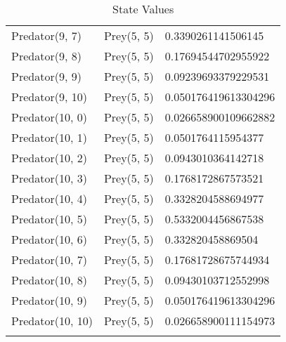 \begin{longtable}{| p{} | p{} | p{} |}
Predator(9, 7) & Prey(5, 5) &0.3390261141506145\\
Predator(9, 8) & Prey(5, 5) &0.17694544702955922\\
Predator(9, 9) & Prey(5, 5) &0.09239693379229531\\
Predator(9, 10) & Prey(5, 5) &0.050176419613304296\\
Predator(10, 0) & Prey(5, 5) &0.026658900109662882\\
Predator(10, 1) & Prey(5, 5) &0.0501764115954377\\
Predator(10, 2) & Prey(5, 5) &0.0943010364142718\\
Predator(10, 3) & Prey(5, 5) &0.1768172867573521\\
Predator(10, 4) & Prey(5, 5) &0.3328204588694977\\
Predator(10, 5) & Prey(5, 5) &0.5332004456867538\\
Predator(10, 6) & Prey(5, 5) &0.332820458869504\\
Predator(10, 7) & Prey(5, 5) &0.17681728675744934\\
Predator(10, 8) & Prey(5, 5) &0.09430103712552998\\
Predator(10, 9) & Prey(5, 5) &0.050176419613304296\\
Predator(10, 10) & Prey(5, 5) &0.026658900111154973\\
\caption{State Values} 
\label{tab:myfirstlongtable}
\end{longtable}

